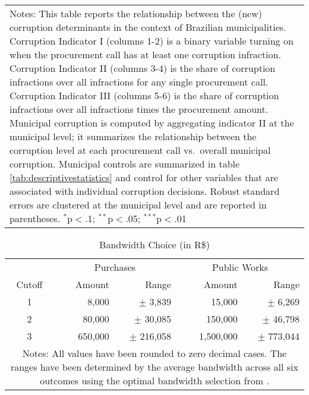 \documentclass[11pt]{article}
\newcommand\T{\rule{0pt}{2.6ex}}       %
\newcommand\B{\rule[-1.2ex]{0pt}{0pt}} %
\begin{document}
\begin{table}[!htbp]
\begin{tabular}{l@{\extracolsep{4pt}}ccccc@{\extracolsep{4pt}}c}
  \hline
  \multicolumn{7}{p{.93\textwidth}}{\footnotesize{Notes: This table reports the relationship between the (new) corruption determinants in the context of Brazilian municipalities. Corruption Indicator I (columns 1-2) is a binary variable turning on when the procurement call has at least one corruption infraction. Corruption Indicator II (columns 3-4) is the share of corruption infractions over all infractions for any single procurement call. Corruption Indicator III (columns 5-6) is the share of corruption infractions over all infractions times the procurement amount. Municipal corruption is computed by aggregating indicator II at the municipal level; it summarizes the relationship between the corruption level at each procurement call vs.~overall municipal corruption. Municipal controls are summarized in table \ref{tab:descriptivestatistics} and control for other variables that are associated with individual corruption decisions. Robust standard errors are clustered at the municipal level and are reported in parentheses. $^{*}$p$<$.1; $^{**}$p$<$.05; $^{***}$p$<$.01}} \T
  \end{tabular}
\end{table}

\newpage

\begin{table}[!htbp]
\caption{\label{tab:bandwidth}Bandwidth Choice (in R\$)}
\centering
\small
  \begin{tabular}{crr@{\extracolsep{6pt}}rr@{\extracolsep{6pt}}}
    \hline

    \hline
    & \multicolumn{2}{c}{Purchases} & \multicolumn{2}{c}{Public Works} \T \B \\
    \cline{2-3} \cline{4-5}
    Cutoff & Amount  & Range         & Amount    & Range               \T \B \\
    \hline
    1      & 8,000   & $\pm$ 3,839   & 15,000    & $\pm$ 6,269         \T \B \\
    2      & 80,000  & $\pm$ 30,085  & 150,000   & $\pm$ 46,798        \T \B \\
    3      & 650,000 & $\pm$ 216,058 & 1,500,000 & $\pm$ 773,044       \T \B \\
    \hline

    \hline
    \multicolumn{5}{p{.5\textwidth}}{\footnotesize{Notes: All values have been rounded to zero decimal cases. The ranges have been determined by the average bandwidth across all six outcomes using the optimal bandwidth selection from \citet{CalonicoRobustNonparametricConfidence2014, CalonicoOptimalDataDrivenRegression2015, CattaneoInterpretingRegressionDiscontinuity2016}.}}
  \end{tabular}
\end{table}

\setlength\bibsep{0pt}


\end{document}
